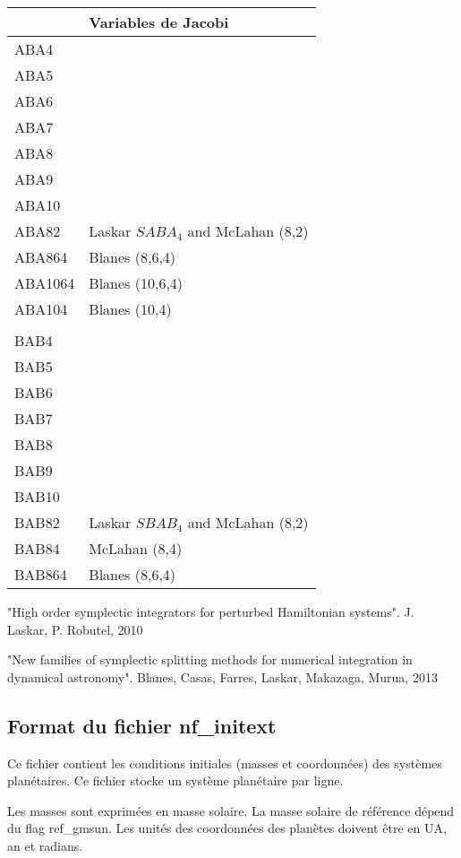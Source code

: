 \documentclass[11pt]{article}
\begin{document}
\begin{tabularx}{\textwidth}{|l|X|}
\hline
&Variables de Jacobi\\
\hline
ABA4& \\
ABA5& \\
ABA6& \\
ABA7& \\
ABA8& \\
ABA9& \\
ABA10& \\
ABA82 & Laskar $SABA_4$ and McLahan (8,2) \\
ABA864  & Blanes (8,6,4) \\
ABA1064 & Blanes (10,6,4) \\
ABA104 & Blanes (10,4) \\
& \\
BAB4& \\
BAB5& \\
BAB6& \\
BAB7& \\
BAB8& \\
BAB9& \\
BAB10& \\
BAB82 &  Laskar $SBAB_4$ and McLahan (8,2) \\
BAB84 &  McLahan (8,4) \\
BAB864  & Blanes (8,6,4) \\
\hline
\end{tabularx}

"High order symplectic integrators for perturbed Hamiltonian systems".
J. Laskar, P. Robutel, 2010

"New families of symplectic splitting methods for numerical integration in dynamical astronomy". Blanes, Casas, Farres, Laskar, Makazaga, Murua, 2013 



\subsection{Format du fichier nf\_initext}

Ce fichier contient les conditions initiales (masses et coordonn\'ees) des syst\`emes plan\'etaires. 
Ce fichier stocke un syst\`eme plan\'etaire par ligne.

Les masses sont exprimées en masse solaire.  La masse solaire de référence dépend du flag ref\_gmsun.
Les unit\'es des coordonn\'ees des plan\`etes doivent \^etre en UA, an et radians.
\end{document}
